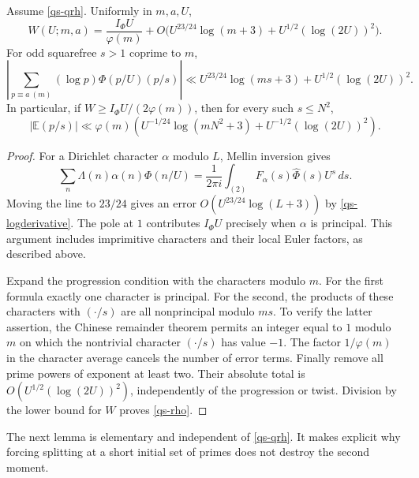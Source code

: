 \begin{lemma}\label{qs-correlations}
Assume \eqref{qs-qrh}. Uniformly in $m,a,U$,
\[
 W(U;m,a)=\frac{I_\Phi U}{\varphi(m)}
       +O\bigl(U^{23/24}\log(m+3)+U^{1/2}(\log(2U))^2\bigr).
\]
For odd squarefree $s>1$ coprime to $m$,
\[
 \left|\sum_{p\equiv a\ (m)}(\log p)\Phi(p/U)(p/s)\right|
 \ll U^{23/24}\log(ms+3)+U^{1/2}(\log(2U))^2.
\]
In particular, if $W\ge I_\Phi U/(2\varphi(m))$, then
for every such $s\le N^2$,
\begin{equation}\label{qs-rho}
 |\mathbb E(p/s)|\ll\varphi(m)
 \left(U^{-1/24}\log(mN^2+3)
             +U^{-1/2}(\log(2U))^2\right).
\end{equation}
\end{lemma}
\begin{proof}
For a Dirichlet character $\alpha$ modulo $L$, Mellin inversion gives
\[
 \sum_n\Lambda(n)\alpha(n)\Phi(n/U)
 =\frac1{2\pi i}\int_{(2)}F_\alpha(s)
                          \widehat\Phi(s)U^s\,ds.
\]
Moving the line to $23/24$ gives an error
$O(U^{23/24}\log(L+3))$ by \eqref{qs-logderivative}.
The pole at $1$ contributes $I_\Phi U$ precisely when $\alpha$
is principal. This argument includes imprimitive characters and
their local Euler factors, as described above.

Expand the progression condition with the characters modulo $m$.
For the first formula exactly one character is principal. For the
second, the products of these characters with $(\cdot/s)$ are all
nonprincipal modulo $ms$. To verify the latter assertion, the Chinese
remainder theorem permits an integer equal to $1$ modulo $m$ on
which the nontrivial character $(\cdot/s)$ has value $-1$.
The factor $1/\varphi(m)$ in the character average cancels the
number of error terms. Finally remove all prime powers of exponent
at least two. Their absolute total is
$O(U^{1/2}(\log(2U))^2)$, independently of the progression or
twist. Division by the lower bound for $W$ proves
\eqref{qs-rho}.
\end{proof}

The next lemma is elementary and independent of
\eqref{qs-qrh}. It makes explicit why forcing splitting at a short
initial set of primes does not destroy the second moment.

